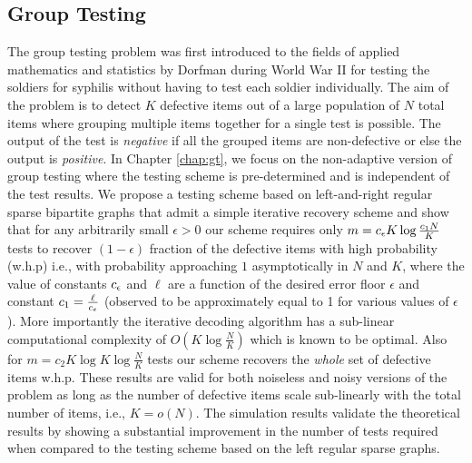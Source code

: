 \subsection*{Group Testing}
The group testing problem was first introduced to the fields of applied mathematics and statistics by Dorfman \cite{dorfman1943detection} during World War II for testing the soldiers for syphilis without having to test each soldier individually. The aim of the problem is to detect $K$ defective items out of a large population of $N$ total items where grouping multiple items together for a single test is possible. The output of the test is \textit{negative} if all the grouped items are non-defective or else the output is \textit{positive}. In Chapter \ref{chap:gt}, we focus on the non-adaptive version of group testing where the testing scheme is pre-determined and is independent of the test results. We propose a testing scheme based on left-and-right regular sparse bipartite graphs that admit a simple iterative recovery scheme and show that for any arbitrarily small $\epsilon>0$ our scheme requires only $m=c_{\epsilon} K\log \frac{c_1N}{K}$ tests to recover $(1-\epsilon)$ fraction of the defective items with high probability (w.h.p) i.e., with probability approaching $1$ asymptotically in $N$ and $K$, where the value of constants $c_{\epsilon}$ and $\ell$ are a function of the desired error floor $\epsilon$ and constant $c_1=\frac{\ell}{c_{\epsilon}}$ (observed to be approximately equal to 1 for various values of $\epsilon$). More importantly the iterative decoding algorithm has a sub-linear computational complexity of $O(K\log \frac{N}{K})$ which is known to be optimal. Also for $m=c_2 K\log K\log \frac{N}{K}$ tests our scheme recovers the \textit{whole} set of defective items w.h.p. These results are valid for both noiseless and noisy versions of the problem as long as the number of defective items scale sub-linearly with the total number of items, i.e., $K=o(N)$. The simulation results validate the theoretical results by showing a substantial improvement in the number of tests required when compared to the testing scheme based on the left regular sparse graphs.


